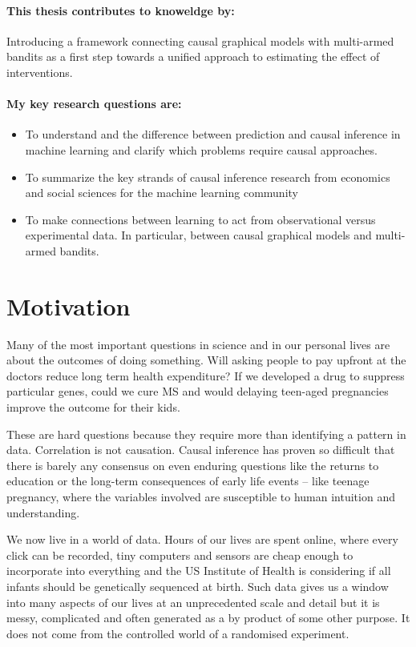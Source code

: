 \documentclass[11pt,a4paper,oneside]{book}
\begin{document}
\paragraph*{This thesis contributes to knoweldge by:} Introducing a framework connecting causal graphical models with multi-armed bandits as a first step towards a unified approach to estimating the effect of interventions.  

\paragraph*{My key research questions are:} 
\begin{itemize}
\item To understand and the difference between prediction and causal inference in machine learning and clarify which problems require causal approaches.
\item To summarize the key strands of causal inference research from economics and social sciences for the machine learning community
\item To make connections between learning to act from observational versus experimental data. In particular, between causal graphical models and multi-armed bandits.
\end{itemize}

\section*{Motivation}
Many of the most important questions in science and in our personal lives are about the outcomes of doing something. Will asking people to pay upfront at the doctors reduce long term health expenditure? If we developed a drug to suppress particular genes, could we cure MS and would delaying teen-aged pregnancies improve the outcome for their kids.  

These are hard questions because they require more than identifying a pattern in data. Correlation is not causation. Causal inference has proven so difficult that there is barely any consensus on even enduring questions like the returns to education or the long-term consequences of early life events – like teenage pregnancy, where the variables involved are susceptible to human intuition and understanding. 

We now live in a world of data. Hours of our lives are spent online, where every click can be recorded, tiny computers and sensors are cheap enough to incorporate into everything and the US Institute of Health is considering if all infants should be genetically sequenced at birth. Such data gives us a window into many aspects of our lives at an unprecedented scale and detail but it is messy, complicated and often generated as a by product of some other purpose. It does not come from the controlled world of a randomised experiment.
\end{document}
